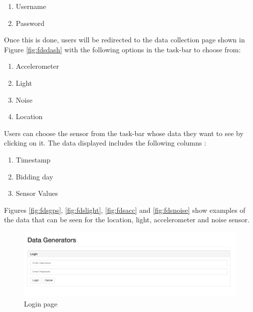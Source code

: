 \begin{enumerate}
    \item Username
    \item Password
\end{enumerate}

Once this is done, users will be redirected to the data collection page shown in Figure \ref{fig:fdsdash} with the following options in the task-bar  to choose from:

\begin{enumerate}
    \item Accelerometer
    \item Light
    \item Noise
    \item Location
\end{enumerate}

Users can choose the sensor from the task-bar whose data they want to see by clicking on it. The data displayed includes the following columns :

\begin{enumerate}
    \item Timestamp
    \item Bidding day
    \item Sensor Values
\end{enumerate}

Figures \ref{fig:fdsgps}, \ref{fig:fdslight}, \ref{fig:fdsacc} and \ref{fig:fdsnoise} show examples of the data that can be seen for the location,
light, accelerometer and noise sensor.



  


\begin{figure}[ht!]
\centering
\includegraphics[width=\textwidth,keepaspectratio]{./images/fds_user_login1}
\caption{Login page\label{fig:fdslogin}}
\end{figure}

